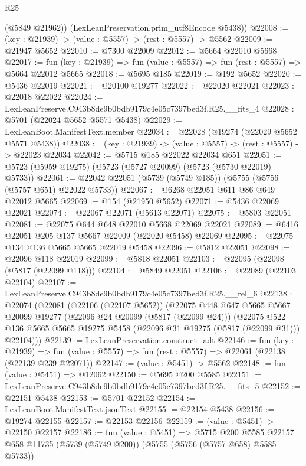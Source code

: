 \begin{lexlean}{R25}
\begin{coremodule}
        (@5849 @21962))
      (LexLeanPreservation.prim_utf8Encode @5438))
@22008 := (key : @21939) -> (value : @5557) -> (rest : @5557) -> @5562
@22009 := @21947 @5652
@22010 := @7300 @22009
@22012 := @5664 @22010 @5668
@22017 := fun (key : @21939) => fun (value : @5557) => fun (rest : @5557) => @5664 @22012 @5665
@22018 := @5695 @185
@22019 := @192 @5652
@22020 := @5436 @22019
@22021 := @20100 @19277
@22022 := @22020 @22021
@22023 := @22018 @22022
@22024 := LexLeanPreserve.C943b8de9b0bdb9179c4e05c7397bed3f.R25.__fits_4
@22028 := @5701 (@22024 @5652 @5571 @5438)
@22029 := LexLeanBoot.ManifestText.member
@22034 := @22028 (@19274 (@22029 @5652 @5571 @5438))
@22038 := (key : @21939) -> (value : @5557) -> (rest : @5557) -> @22023 @22034
@22042 := @5715 @185 @22022 @22034 @651
@22051 := @5723 (@5959 @19275) (@5723 (@5727 @20099) (@5723 (@5730 @22019) @5733))
@22061 := @22042 @22051 (@5739 (@5749 @185)) (@5755 (@5756 (@5757 @651) @22022 @5733))
@22067 := @6268 @22051 @611 @86 @649 @22012 @5665
@22069 := @154 (@21950 @5652)
@22071 := @5436 @22069 @22021
@22074 := @22067 @22071 (@5613 @22071)
@22075 := @5803 @22051
@22081 := @22075 @644 @648 @22010 @5668 @22069 @22021
@22089 := @6416 @22051 @205 @137 @5667 @22009 (@22020 @5458) @22069
@22095 := @22075 @134 @136 @5665 @5665 @22019 @5458
@22096 := @5812 @22051
@22098 := @22096 @118 @22019
@22099 := @5818 @22051
@22103 := @22095 (@22098 (@5817 (@22099 @118)))
@22104 := @5849 @22051
@22106 := @22089 (@22103 @22104)
@22107 := LexLeanPreserve.C943b8de9b0bdb9179c4e05c7397bed3f.R25.__rel_6
@22138 := @22074
    (@22081
      (@22106 (@22107 @5652))
      (@22075
        @448
        @647
        @5665
        @5667
        @20099
        @19277
        (@22096 @24 @20099 (@5817 (@22099 @24)))
        (@22075
          @522
          @136
          @5665
          @5665
          @19275
          @5458
          (@22096 @31 @19275 (@5817 (@22099 @31)))
          @22104)))
@22139 := LexLeanPreservation.construct_adt
@22146 := fun (key : @21939) =>
  fun (value : @5557) => fun (rest : @5557) => @22061 (@22138 (@22139 @239 @22071))
@22147 := (value : @5451) -> @5562
@22148 := fun (value : @5451) => @12062
@22150 := @5695 @200 @5585
@22151 := LexLeanPreserve.C943b8de9b0bdb9179c4e05c7397bed3f.R25.__fits_5
@22152 := @22151 @5438
@22153 := @5701 @22152
@22154 := LexLeanBoot.ManifestText.jsonText
@22155 := @22154 @5438
@22156 := @19274 @22155
@22157 := @22153 @22156
@22159 := (value : @5451) -> @22150 @22157
@22186 := fun (value : @5451) =>
  @5715
    @200
    @5585
    @22157
    @658
    @11735
    (@5739 (@5749 @200))
    (@5755 (@5756 (@5757 @658) @5585 @5733))

\end{coremodule}
\end{lexlean}
